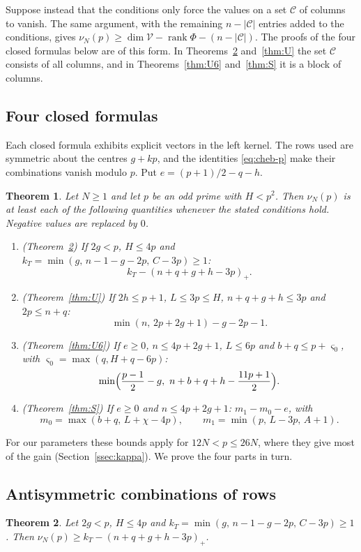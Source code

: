 \documentclass[11pt]{amsart}
\newtheorem{theorem}{Theorem}[section]
\theoremstyle{definition}
\theoremstyle{remark}
\numberwithin{equation}{section}
\newcommand{\cV}{\mathcal V}
\begin{document}
Suppose instead that the conditions only force the values on a set $\mathcal C$ of columns to vanish. The
same argument, with the remaining $n-|\mathcal C|$ entries added to the conditions, gives
$\nu_N(p)\ge\dim\cV-\operatorname{rank}\Phi-(n-|\mathcal C|)$. The proofs of the four closed formulas below
are of this form. In Theorems~\ref{thm:T} and~\ref{thm:U} the set $\mathcal C$ consists of all columns, and in
Theorems~\ref{thm:U6} and~\ref{thm:S} it is a block of columns.

\subsection{Four closed formulas}
Each closed formula exhibits explicit vectors in the left kernel. The rows used are symmetric about the
centres $g+kp$, and the identities \eqref{eq:cheb-p} make their combinations vanish modulo $p$. Put
$e=(p+1)/2-q-h$.

\begin{theorem}\label{thm:content}
Let $N\ge1$ and let $p$ be an odd prime with $H<p^2$. Then $\nu_N(p)$ is at least each of the following
quantities whenever the stated conditions hold. Negative values are replaced by $0$.
\begin{enumerate}[label=(\alph*)]
\item (Theorem~\ref{thm:T}) If $2g<p$, $H\le4p$ and $k_T=\min(g,\,n-1-g-2p,\,C-3p)\ge1$:
\[
 k_T-(n+q+g+h-3p)_+ .
\]
\item (Theorem~\ref{thm:U}) If $2h\le p+1$, $L\le3p\le H$, $n+q+g+h\le3p$ and $2p\le n+q$:
\[
 \min(n,\,2p+2g+1)-g-2p-1 .
\]
\item (Theorem~\ref{thm:U6}) If $e\ge0$, $n\le4p+2g+1$, $L\le6p$ and $b+q\le p+\varsigma_0$, with
$\varsigma_0=\max(q,H+q-6p)$:
\[
 \min\Bigl(\frac{p-1}2-g,\ n+b+q+h-\frac{11p+1}2\Bigr).
\]
\item (Theorem~\ref{thm:S}) If $e\ge0$ and $n\le4p+2g+1$: $m_1-m_0-e$, with
\[
 m_0=\max(b+q,\,L+\chi-4p),\qquad m_1=\min(p,\,L-3p,\,A+1).
\]
\end{enumerate}
\end{theorem}

For our parameters these bounds apply for $12N<p\le26N$, where they give most of the gain
(Section~\ref{ssec:kappa}). We prove the four parts in turn.

\subsection{Antisymmetric combinations of rows}
\begin{theorem}\label{thm:T}
Let $2g<p$, $H\le4p$ and $k_T=\min(g,\,n-1-g-2p,\,C-3p)\ge1$. Then
$\nu_N(p)\ge k_T-(n+q+g+h-3p)_+$.
\end{theorem}
\end{document}
